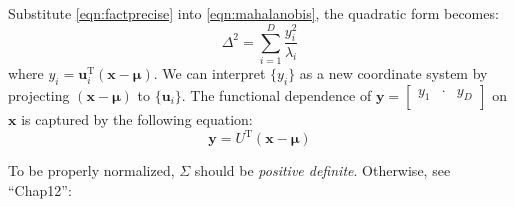 Substitute \eqref{eqn:factprecise} into \eqref{eqn:mahalanobis}, the
quadratic form becomes:
\begin{equation}
\Delta^{2}=\sum_{i=1}^{D}\frac{y_{i}^2}{\lambda_{i}}
\end{equation}
where
$y_{i}=\mathbf{u}_{i}^{\mathrm{T}}(\mathbf{x}-\boldsymbol{\mu})$. We
can interpret $\{y_{i}\}$ as a new coordinate system by projecting
$(\mathbf{x}-\boldsymbol{\mu})$ to $\{\mathbf{u}_{i}\}$. The
functional dependence of
$\mathbf{y}=\begin{bmatrix}y_{1}&\cdot{}&y_{D}\\\end{bmatrix}$ on $\mathbf{x}$ is captured by
the following equation:
\begin{equation}
\mathbf{y}=U^{\mathrm{T}}(\mathbf{x}-\boldsymbol{\mu})
\label{eqn:replacevariable}    
\end{equation}


To be properly normalized, $\Sigma$ should be \emph{positive
    definite}. Otherwise, see ``Chap12'':


